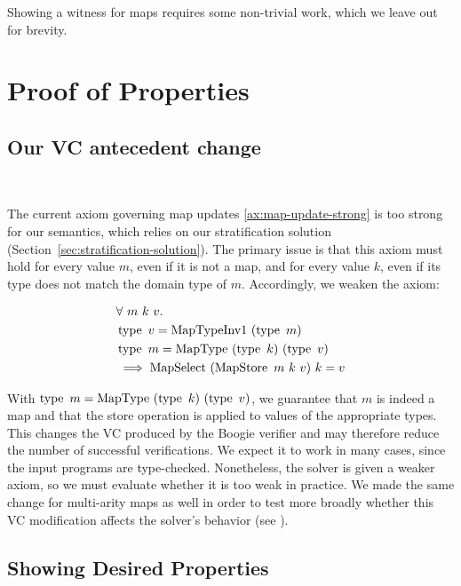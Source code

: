 Showing a witness for maps requires some non-trivial work,
which we leave out for brevity.


\section{Proof of Properties}

\subsection{Our VC antecedent change} \mbox{}\\
\label{sec:our-vc-change}

The current axiom governing map updates \eqref{ax:map-update-strong}
is too strong for our semantics,
which relies on our stratification solution (Section~\ref{sec:stratification-solution}).
The primary issue is that this axiom must hold for every value $m$,
even if it is not a map, and for every value $k$,
even if its type does not match the domain type of $m$.
Accordingly, we weaken the axiom:

\begin{equation}
  \label{ax:map-update-weak}
  \begin{aligned}
    &\forall \ m \ k \ v.\\
    &\operatorname{type}\ v = \operatorname{MapTypeInv1}\ (\operatorname{type}\ m)\\
    &\operatorname{type}\ m = \operatorname{MapType}\ (\operatorname{type}\ k)\ (\operatorname{type}\ v)\\
    &\implies  \operatorname{MapSelect}\ (\operatorname{MapStore}\ m\ k\ v)\ k = v
  \end{aligned}
\end{equation}

With $\type\ m = \MapType\ (\type\ k)\ (\type\ v)$, we guarantee
that $m$ is indeed a map and that the store operation is applied to values of the appropriate types.
This changes the VC produced by the Boogie verifier
and may therefore reduce the number of successful verifications.
We expect it to work in many cases, since the input programs are type-checked.
Nonetheless, the solver is given a weaker axiom,
so we must evaluate whether it is too weak in practice.
We made the same change for multi-arity maps as well
in order to test more broadly whether this VC modification affects the solver's behavior (see ).


\subsection{Showing Desired Properties}
\label{sec:typedef-lifting}

